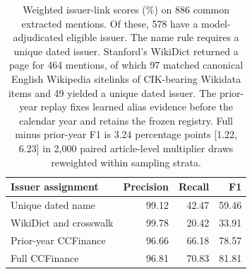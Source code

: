 \begin{table}[t]
  \centering
  \small
  \begin{tabular}{lrrr}
    \toprule
    Issuer assignment & Precision & Recall & F1 \\
    \midrule
    Unique dated name & 99.12 & 42.47 & 59.46 \\
    WikiDict and crosswalk & 99.78 & 20.42 & 33.91 \\
    Prior-year CCFinance & 96.66 & 66.18 & 78.57 \\
    Full CCFinance & 96.81 & 70.83 & 81.81 \\
    \bottomrule
  \end{tabular}
  \caption{Weighted issuer-link scores (\%) on 886 common extracted
    mentions. Of these, 578 have a model-adjudicated eligible issuer.
    The name rule requires a unique dated issuer. Stanford's WikiDict
    returned a page for 464 mentions, of which 97 matched canonical
    English Wikipedia sitelinks of CIK-bearing Wikidata items and 49
    yielded a unique dated issuer. The prior-year replay fixes learned
    alias evidence before the calendar year and retains the frozen
    registry. Full minus prior-year F1 is 3.24 percentage points
    [1.22, 6.23] in 2,000 paired article-level multiplier draws
  reweighted within sampling strata.}
  \label{tab:app-link-baselines}
\end{table}

